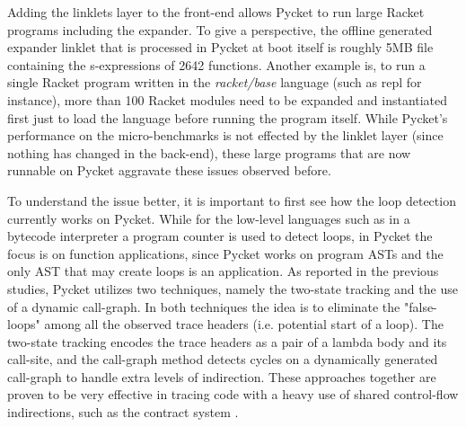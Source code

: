 Adding the linklets layer to the front-end allows Pycket to run large
Racket programs including the expander. To give a perspective, the
offline generated expander linklet that is processed in Pycket at boot
itself is roughly 5MB file containing the s-expressions of 2642
functions. Another example is, to run a single Racket program written
in the \emph{racket/base} language (such as repl for instance), more
than 100 Racket modules need to be expanded and instantiated first
just to load the language before running the program itself. While
Pycket's performance on the micro-benchmarks is not effected by the
linklet layer (since nothing has changed in the back-end), these large
programs that are now runnable on Pycket aggravate these issues
observed before.


To understand the issue better, it is important to first see how the
loop detection currently works on Pycket. While for the low-level
languages such as in a bytecode interpreter a program counter is used
to detect loops, in Pycket the focus is on function applications,
since Pycket works on program ASTs and the only AST that may create
loops is an application. As reported in the previous studies, Pycket
utilizes two techniques, namely the two-state tracking and the use of
a dynamic call-graph. In both techniques the idea is to eliminate the
"false-loops" among all the observed trace headers (i.e. potential
start of a loop). The two-state tracking encodes the trace headers as
a pair of a lambda body and its call-site, and the call-graph method
detects cycles on a dynamically generated call-graph to handle extra
levels of indirection. These approaches together are proven to be very
effective in tracing code with a heavy use of shared control-flow
indirections, such as the contract system \cite{pycket15,pycket17}.


